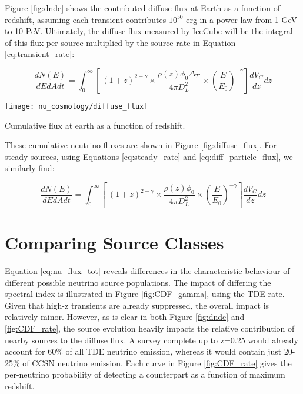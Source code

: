 Figure \ref{fig:dnde} shows the contributed diffuse flux at Earth as a function of redshift, assuming each transient contributes $10^{50}$ erg in a power law from 1 GeV to 10 PeV. Ultimately, the diffuse flux measured by IceCube will be the integral of this flux-per-source multiplied by the source rate in Equation \ref{eq:transient_rate}:

\begin{equation}
\frac{dN(E)}{dEdAdt} = \int_{0}^{\infty} \left[ \ (1+z)^{2 - \gamma} \times \frac{\rho(z)\phi_{0} \Delta_{T'}}{4 \pi D_{L}^{2}} \times \left( \frac{E}{E_{0}}\right) ^{-\gamma}  \right] \frac{dV_{C}}{dz} dz
\label{eq:nu_flux_tot}
\end{equation}

\begin{marginfigure}
	\centering \texttt{[image: nu\_cosmology/diffuse\_flux]}
	\caption{Cumulative flux at earth as a function of redshift.}
	\label{fig:diffuse_flux}
\end{marginfigure}

These cumulative neutrino fluxes are shown in Figure \ref{fig:diffuse_flux}. For steady sources, using Equations \ref{eq:steady_rate} and \ref{eq:diff_particle_flux}, we similarly find:

\begin{equation}
\frac{dN(E)}{dEdAdt} = \int_{0}^{\infty} \left[ \ (1+z)^{2 - \gamma} \times \frac{\overline{\rho(z)}\phi_{0}}{4 \pi D_{L}^{2}} \times \left( \frac{E}{E_{0}}\right) ^{-\gamma}  \right] \frac{dV_{C}}{dz} dz
\label{eq:nu_flux_tot_steady}
\end{equation}

\section{Comparing Source Classes}

Equation \ref{eq:nu_flux_tot} reveals differences in the characteristic behaviour of different possible neutrino source populations. The impact of differing the spectral index is illustrated in Figure \ref{fig:CDF_gamma}, using the TDE rate. Given that high-z transients are already suppressed, the overall impact is relatively minor. However, as is clear in both Figure \ref{fig:dnde} and \ref{fig:CDF_rate}, the source evolution heavily impacts the relative contribution of nearby sources to the diffuse flux. A survey complete up to z=0.25 would already account for 60\% of all TDE neutrino emission, whereas it would contain just 20-25\% of CCSN neutrino emission. Each curve in Figure \ref{fig:CDF_rate} gives the per-neutrino probability of detecting a counterpart as a function of maximum redshift.

